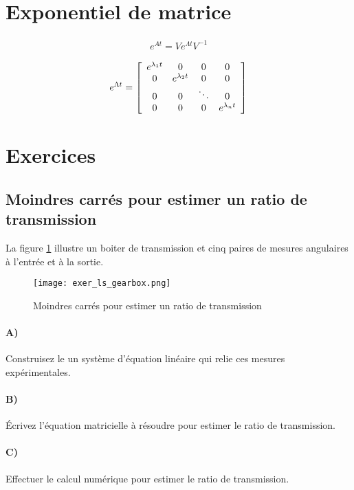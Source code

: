 \section{Exponentiel de matrice}

\begin{align}
e^{At} = V e^{\Lambda t} V^{-1}
\end{align}

\begin{align}
e^{\Lambda t} = 
\left[ \begin{array}{c c c c}  
e^{\lambda_1 t} &  0          & 0 & 0 \\
0         &  e^{\lambda_2 t}  & 0      & 0 \\
0         &  0          &\ddots  & 0 \\
0         &  0          & 0  & e^{\lambda_n t}
\end{array} \right]
\end{align}

\newpage
\section{Exercices}

\subsection{Moindres carrés pour estimer un ratio de transmission}

La figure \ref{fig:exer_ls_gearbox} illustre un boiter de transmission et cinq paires de mesures angulaires à l'entrée et à la sortie. 
\begin{figure}[H]
	\centering
		\texttt{[image: exer\_ls\_gearbox.png]}
	\caption{Moindres carrés pour estimer un ratio de transmission}
	\label{fig:exer_ls_gearbox}
\end{figure}

\paragraph{A)}
Construisez le un système d'équation linéaire qui relie ces mesures expérimentales.

\paragraph{B)}
Écrivez l'équation matricielle à résoudre pour estimer le ratio de transmission.

\paragraph{C)}
Effectuer le calcul numérique pour estimer le ratio de transmission.
